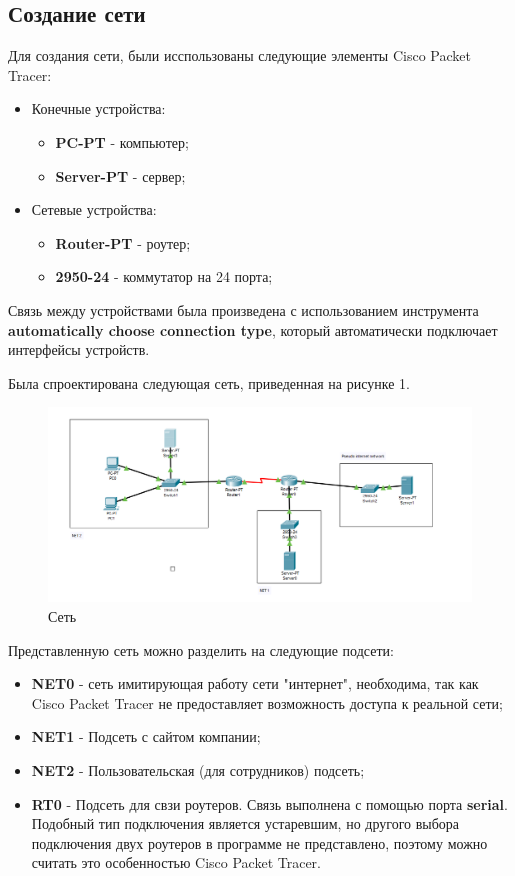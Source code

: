 \documentclass[14pt,a4paper,report]{report}
\begin{document}
\subsection{Создание сети}
Для создания сети, были исспользованы следующие элементы Cisco Packet Tracer:
\begin{itemize}
\item Конечные устройства:
\begin{itemize}
\item \textbf{PC-PT} - компьютер;
\item \textbf{Server-PT} - сервер;
\end{itemize}
\item Сетевые устройства:
\begin{itemize}
\item \textbf{Router-PT} - роутер;
\item \textbf{2950-24} - коммутатор на 24 порта;
\end{itemize}
\end{itemize}
Связь между устройствами была произведена с использованием инструмента \textbf{automatically choose connection type}, который автоматически подключает интерфейсы устройств.

\clearpage
Была спроектирована следующая сеть, приведенная на рисунке 1.

\begin{figure}[h]
  \centering
  \includegraphics[width=.9\textwidth]{img/5}
  \caption{Сеть}
\end{figure}


Представленную сеть можно разделить на следующие подсети:
\begin{itemize}
\item \textbf{NET0} - сеть имитирующая работу сети "интернет", необходима, так как Cisco Packet Tracer не предоставляет возможность доступа к реальной сети;
\item \textbf{NET1} - Подсеть с сайтом компании;
\item \textbf{NET2} - Пользовательская (для сотрудников) подсеть;
\item \textbf{RT0} - Подсеть для свзи роутеров. Связь выполнена с помощью порта \textbf{serial}. Подобный тип подключения является устаревшим, но другого выбора подключения двух роутеров в программе не представлено, поэтому можно считать это особенностью Cisco Packet Tracer.
\end{itemize}
\end{document}
